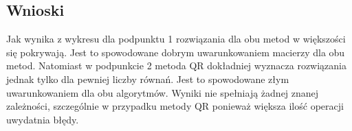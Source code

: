 \documentclass[a4paper, 11pt]{article}
\begin{document}
\vspace{10cm}
\subsection{Wnioski}
Jak wynika z wykresu dla podpunktu 1 rozwiązania dla obu metod w większości się pokrywają. Jest to spowodowane dobrym uwarunkowaniem macierzy dla obu metod. Natomiast w podpunkcie 2 metoda QR dokładniej wyznacza rozwiązania 
jednak tylko dla pewniej liczby równań. Jest to spowodowane złym uwarunkowaniem dla obu algorytmów. Wyniki nie spełniają żadnej znanej zależności, szczególnie w przypadku metody QR ponieważ większa ilość operacji uwydatnia błędy. 
	
\end{document}
